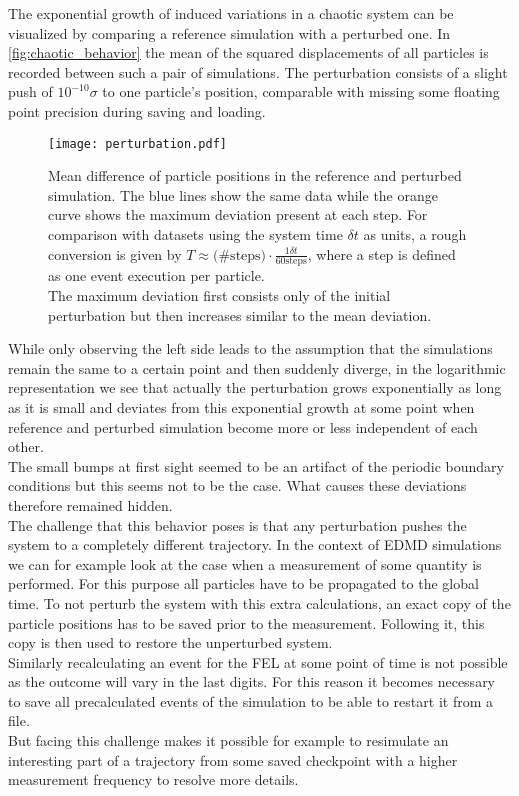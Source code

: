 The exponential growth of induced variations in a chaotic system can be visualized by comparing a reference simulation with a perturbed one. In \autoref{fig:chaotic_behavior} the mean of the squared displacements of all particles is recorded between such a pair of simulations. The perturbation consists of a slight push of $10^{-10} \sigma$ to one particle's position, comparable with missing some floating point precision during saving and loading.\\

\begin{figure}[h]
\centering
\texttt{[image: perturbation.pdf]}
\caption[Exponential growth of perturbations in chaotic system]{Mean difference of particle positions in the reference and perturbed simulation. The blue lines show the same data while the orange curve shows the maximum deviation present at each step. For comparison with datasets using the system time $\delta t$ as units, a rough conversion is given by $T \approx \text{(\#steps)} \cdot \frac{1 \delta t}{60 \text{steps}}$, where a step is defined as one event execution per particle.\\ The maximum deviation first consists only of the initial perturbation but then increases similar to the mean deviation.}
\label{fig:chaotic_behavior}
\end{figure}

While only observing the left side leads to the assumption that the simulations remain the same to a certain point and then suddenly diverge, in the logarithmic representation we see that actually the perturbation grows exponentially as long as it is small and deviates from this exponential growth at some point when reference and perturbed simulation become more or less independent of each other.\\
The small bumps at first sight seemed to be an artifact of the periodic boundary conditions but this seems not to be the case. What causes these deviations therefore remained hidden.\\

The challenge that this behavior poses is that any perturbation pushes the system to a completely different trajectory. In the context of EDMD simulations we can for example look at the case when a measurement of some quantity is performed. For this purpose all particles have to be propagated to the global time. To not perturb the system with this extra calculations, an exact copy of the particle positions has to be saved prior to the measurement. Following it, this copy is then used to restore the unperturbed system.\\ 
Similarly recalculating an event for the FEL at some point of time is not possible as the outcome will vary in the last digits. For this reason it becomes necessary to save all precalculated events of the simulation to be able to restart it from a file.\\
But facing this challenge makes it possible for example to resimulate an interesting part of a trajectory from some saved checkpoint with a higher measurement frequency to resolve more details. 

